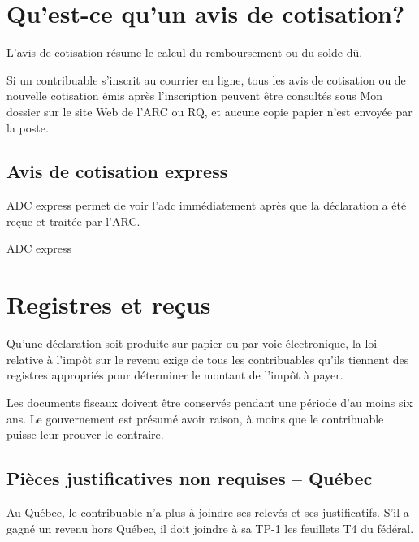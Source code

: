 \section{Qu'est-ce qu'un avis de cotisation?}
\begin{intro}
	L'avis de cotisation résume le calcul du remboursement ou du solde dû.
\end{intro}
\begin{note}
	Si un contribuable s'inscrit au courrier en ligne, tous les avis de cotisation ou de nouvelle cotisation émis après l'inscription peuvent être consultés sous Mon dossier sur le site Web de l'ARC ou RQ, et aucune copie papier n'est envoyée par la poste.
\end{note}


\subsection{Avis de cotisation express}
ADC express permet de voir l'\acrfull{adc} immédiatement après que la déclaration a été reçue et traitée par l'ARC.

\href{https://www.canada.ca/fr/agence-revenu/services/services-electroniques/a-propos-express.html}{ADC express}



\section{Registres et reçus}
\begin{intro}
	Qu'une déclaration soit produite sur papier ou par voie électronique, la loi relative à l'impôt sur le revenu exige de tous les contribuables qu'ils tiennent des registres appropriés pour déterminer le montant de l'impôt à payer.
\end{intro}
Les documents fiscaux doivent être conservés pendant une période d'au moins six ans. Le gouvernement \cat \qct est présumé avoir raison, à moins que le contribuable puisse leur prouver le contraire.


\subsection{Pièces justificatives non requises – Québec}
Au Québec, le contribuable n'a plus à joindre ses relevés et ses justificatifs. S'il a gagné un revenu hors Québec, il doit joindre à sa TP-1 les feuillets T4 du fédéral.



